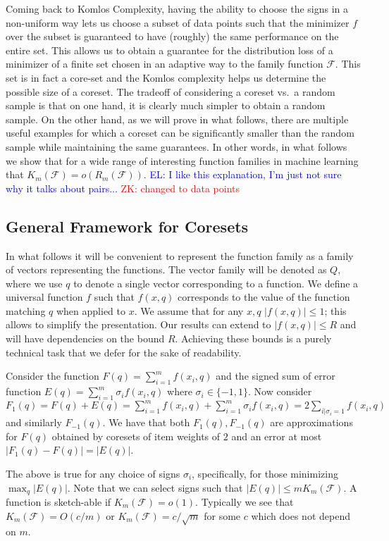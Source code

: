 \documentclass[anon,12pt]{colt2019} %
\newcommand{\zk}[1]{\textcolor{red}{ZK: #1}}
\newcommand{\el}[1]{\textcolor{blue}{EL: #1}}
\newcommand{\F}{\mathcal{F}}
\begin{document}
Coming back to Komlos Complexity, having the ability to choose the signs in a non-uniform way lets us choose a subset of data points such that the minimizer $f$ over the subset is guaranteed to have (roughly) the same performance on the entire set. This allows us to obtain a guarantee for the distribution loss of a minimizer of a finite set chosen in an adaptive way to the family function $\F$. This set is in fact a core-set and the Komlos complexity helps us determine the possible size of a coreset. The tradeoff of considering a coreset vs.\ a random sample is that on one hand, it is clearly much simpler to obtain a random sample. On the other hand, as we will prove in what follows, there are multiple useful examples for which a coreset can be significantly smaller than the random sample while maintaining the same guarantees. In other words, in what follows we show that for a wide range of interesting function families in machine learning that $K_m(\F) = o(R_m(\F))$.
\el{I like this explanation, I'm just not sure why it talks about pairs...} \zk{changed to data points}

\subsection{General Framework for Coresets}

In what follows it will be convenient to represent the function family as a family of vectors representing the functions. The vector family will be denoted as $Q$, where we use $q$ to denote a single vector corresponding to a function. We define a universal function $f$ such that $f(x,q)$ corresponds to the value of the function matching $q$ when applied to $x$. We assume that for any $x,q$ $|f(x,q)| \leq 1$; this allows to simplify the presentation. Our results can extend to $|f(x,q)| \leq R$ and will have dependencies on the bound $R$. Achieving these bounds is a purely technical task that we defer for the sake of readability. 


Consider the function $F(q) = \sum_{i=1}^{m} f(x_i,q)$ and the signed sum of error function $E(q) = \sum_{i=1}^{m} \sigma_i f(x_i,q)$ where $\sigma_i \in \{-1,1\}$.
Now consider $F_1(q) = F(q) + E(q) = \sum_{i=1}^{m} f(x_i,q)  + \sum_{i=1}^{m} \sigma_i f(x_i,q)  = 2 \sum_{i | \sigma_i=1} f(x_i,q)$ and similarly $F_{-1}(q)$. We have that both $F_1(q), F_{-1}(q)$ are approximations for $F(q)$ obtained by coresets of item weights of $2$ and an error at most $|F_1(q) - F(q)| =  |E(q)|$.

%
The above is true for any choice of signs $\sigma_i$, specifically, for those minimizing $\max_q | E(q)|$.
Note that we can select signs such that $|E(q)| \le m K_m(\F)$.
A function is sketch-able if $K_m(\F) = o(1)$.
Typically we see that $K_m(\F) = O(c/m)$ or $K_m(\F)= c/\sqrt{m}$ for some $c$ which does not depend on $m$.
\end{document}
